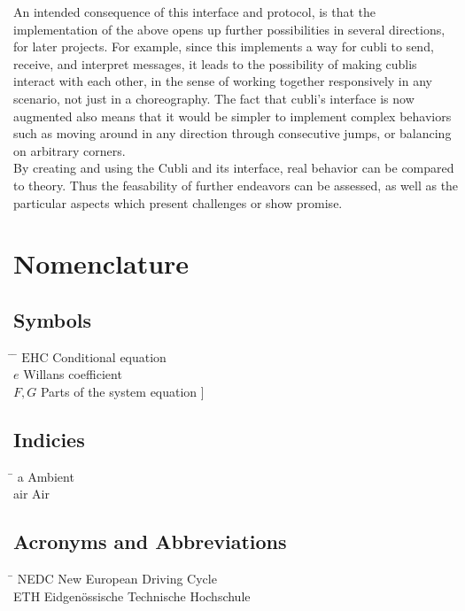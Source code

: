 An intended consequence of this interface and protocol, is that the implementation of the above opens up further possibilities in several directions, for later projects. 
For example, since this implements a way for cubli to send, receive, and interpret messages, it leads to the possibility of making cublis interact with each other, in the sense of working together responsively in any scenario, not just in a choreography.
The fact that cubli's interface is now augmented also means that it would be simpler to implement complex behaviors such as moving around in any direction through consecutive jumps, or balancing on arbitrary corners.\\

By creating and using the Cubli and its interface, real behavior can be compared to theory. Thus the feasability of further endeavors can be assessed, as well as the particular aspects which present challenges or show promise.

 \cleardoublepage


\chapter*{Nomenclature}\label{chap:symbole}

\section*{Symbols}
\begin{tabbing}
 \hspace*{1.6cm} \= \hspace*{8cm} \= \kill
 $\mathrm{EHC}$ \> Conditional equation \> [$-$] \\[0.5ex]
 $e$ \> Willans coefficient \> [$-$] \\[0.5ex]
 $F,G$ \> Parts of the system equation \> [\unitfrac[]{K}{s}]
\end{tabbing}

\section*{Indicies}
\begin{tabbing}
 \hspace*{1.6cm}  \= \kill
 a \> Ambient \\[0.5ex]
 air \> Air
\end{tabbing}

\section*{Acronyms and Abbreviations}
\begin{tabbing}
 \hspace*{1.6cm}  \= \kill
 NEDC \> New European Driving Cycle \\[0.5ex]
 ETH \> Eidgen\"{o}ssische Technische Hochschule
\end{tabbing}

 \cleardoublepage

